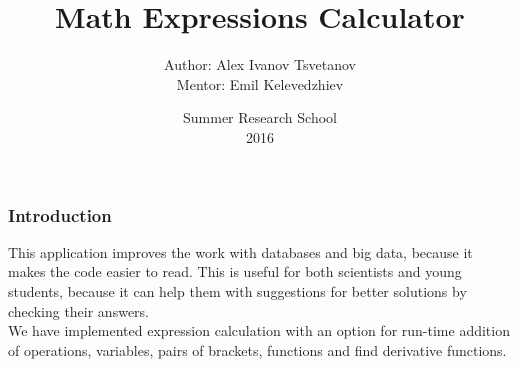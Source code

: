 \documentclass[12pt]{beamer}
\begin{document}
    \date[SRS'16]{Summer Research School \\ 2016}
    \author[Mr. Kelevedzhiev (BAS), Alex]{
        \begin{table}[]
        \begin{tabular}{rl}
        \normalsize{Author:    } & \normalsize{Alex Ivanov Tsvetanov} \\
        \scriptsize{Mentor:     } & \scriptsize{Emil Kelevedzhiev} \\
        \end{tabular}
        \end{table}
	}
	\title[MEC]{Math Expressions Calculator}

	\begin{frame}
		\titlepage
	\end{frame}

	\begin{frame}
	\frametitle{Introduction}
		\begin{block}{}
			This application improves the work with databases and big data, because it makes the code easier to read. This is useful for both scientists and young students, because it can help them with suggestions for better solutions by checking their answers. \\
			We have implemented expression calculation with an option for run-time addition of operations, variables, pairs of brackets, functions and find derivative functions.
		\end{block}
	\end{frame}
\end{document}
